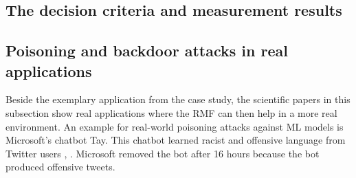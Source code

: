\subsection{The decision criteria and measurement results}

\subsection{Poisoning and backdoor attacks in real applications}

Beside the exemplary application from the case study, the scientific papers in this subsection show real applications where the RMF can then help in a more real environment. An example for real-world poisoning attacks against ML models is Microsoft's chatbot Tay. This chatbot learned racist and offensive language from Twitter users \cite{DBLP:conf/iciot/BaracaldoCLSZ18}, \cite{DBLP:conf/ccs/BaracaldoCLS17}. Microsoft removed the bot after 16 hours because the bot produced offensive tweets.
